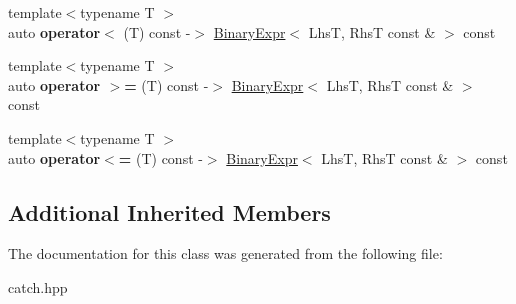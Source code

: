 \begin{DoxyCompactItemize}
\item 
\mbox{\label{classCatch_1_1BinaryExpr_a7e6c3dcf59b3cd51e7c82355da3ef451}} 
{\footnotesize template$<$typename T $>$ }\\auto {\bfseries operator$<$} (T) const -\/$>$ \mbox{\hyperlink{classCatch_1_1BinaryExpr}{Binary\+Expr}}$<$ LhsT, RhsT const \& $>$ const
\item 
\mbox{\label{classCatch_1_1BinaryExpr_a5b61ffcbbfd28c40bd25bb56599df489}} 
{\footnotesize template$<$typename T $>$ }\\auto {\bfseries operator $>$=} (T) const -\/$>$ \mbox{\hyperlink{classCatch_1_1BinaryExpr}{Binary\+Expr}}$<$ LhsT, RhsT const \& $>$ const
\item 
\mbox{\label{classCatch_1_1BinaryExpr_a5590a2c5f5074ca2509c09b92bfcdf57}} 
{\footnotesize template$<$typename T $>$ }\\auto {\bfseries operator$<$=} (T) const -\/$>$ \mbox{\hyperlink{classCatch_1_1BinaryExpr}{Binary\+Expr}}$<$ LhsT, RhsT const \& $>$ const
\end{DoxyCompactItemize}
\subsection*{Additional Inherited Members}


The documentation for this class was generated from the following file\+:\begin{DoxyCompactItemize}
\item 
catch.\+hpp\end{DoxyCompactItemize}
